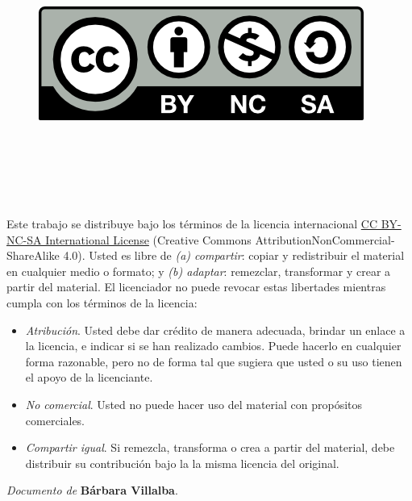 
\cleardoublepage

\begin{figure}
 \ \ \ \ \includegraphics[width=0.25\linewidth]{figs/by-nc-sa.png}
 \label{fig:cc} 
 \end{figure}

\

\

\

\noindent
Este trabajo se distribuye bajo los términos de la licencia internacional \href{http://creativecommons.org/licenses/by-nc-sa/4.0/}{CC BY-NC-SA International License} (Creative Commons AttributionNonCommercial-ShareAlike 4.0). Usted es libre de \textit{(a) compartir}: copiar y redistribuir el material en cualquier medio o formato; y \textit{(b) adaptar}: remezclar, transformar y crear a partir del material. El licenciador no puede revocar estas libertades mientras cumpla con los términos de la licencia:

\begin{itemize}
\item \textit{Atribución}. Usted debe dar crédito de manera adecuada, brindar un enlace a la licencia, e indicar si se han realizado cambios. Puede hacerlo en cualquier forma razonable, pero no de forma tal que sugiera que usted o su uso tienen el apoyo de la licenciante.
\item \textit{No comercial}. Usted no puede hacer uso del material con propósitos comerciales.
\item \textit{Compartir igual}. Si remezcla, transforma o crea a partir del material, debe distribuir su contribución bajo la la misma licencia del original.
\end{itemize}

\begin{flushright}
		\vspace{7.0 cm}
		\emph{Documento de} \textbf{Bárbara Villalba}. %
\end{flushright}

